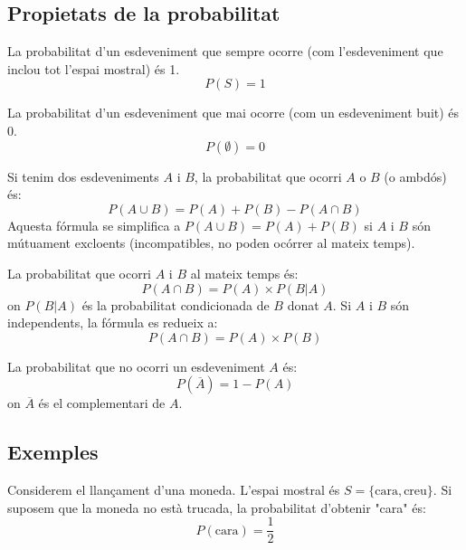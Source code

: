 \documentclass[12pt]{article}
\begin{document}
\subsection*{Propietats de la probabilitat}

\begin{concept}[title=Esdeveniment cert] \noindent
La probabilitat d'un esdeveniment que sempre ocorre (com l'esdeveniment que inclou tot l'espai mostral) és 1.
\[
P(S) = 1
\]
\end{concept}

\begin{concept}[title=Esdeveniment impossible] \noindent
La probabilitat d'un esdeveniment que mai ocorre (com un esdeveniment buit) és 0.
\[
P(\emptyset) = 0
\]
\end{concept}

\begin{concept}[title=Unió d'esdeveniments]\noindent
Si tenim dos esdeveniments $A$ i $B$, la probabilitat que ocorri $A$ o $B$ (o ambdós) és:
\[
P(A \cup B) = P(A) + P(B) - P(A \cap B)
\]
Aquesta fórmula se simplifica a $P(A \cup B) = P(A) + P(B)$ si $A$ i $B$ són mútuament excloents (incompatibles, no poden ocórrer al mateix temps).
\end{concept}

\begin{concept} [title=Intersecció d'esdeveniments]\noindent
La probabilitat que ocorri $A$ i $B$ al mateix temps és:
\[
P(A \cap B) = P(A) \times P(B|A)
\]
on $P(B|A)$ és la probabilitat condicionada de $B$ donat $A$. Si $A$ i $B$ són independents, la fórmula es redueix a:
\[
P(A \cap B) = P(A) \times P(B)
\]
\end{concept}

\begin{concept} [title=Esdeveniment complementari (contrari)]\noindent
La probabilitat que no ocorri un esdeveniment $A$ és:
\[
P(\overline{A}) = 1 - P(A)
\]
on $\overline{A}$ és el complementari de $A$.
\end{concept}

\subsection*{Exemples}

\begin{exemple} \noindent 
Considerem el llançament d'una moneda. L'espai mostral és $S = \{\text{cara}, \text{creu}\}$. Si suposem que la moneda no està trucada, la probabilitat d'obtenir "cara" és:
\[
P(\text{cara}) = \frac{1}{2}
\]
\end{exemple}
\end{document}
